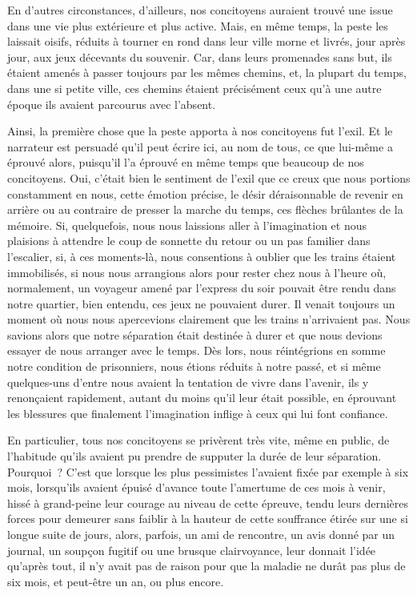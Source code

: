 \documentclass[french,twoside]{book} %
\begin{document}
En d’autres circonstances, d’ailleurs, nos concitoyens auraient trouvé une issue dans une vie plus extérieure et plus active. Mais, en même temps, la peste les laissait oisifs, réduits à tourner en rond dans leur ville morne et livrés, jour après jour, aux jeux décevants du souvenir. Car, dans leurs promenades sans but, ils étaient amenés à passer toujours par les mêmes chemins, et, la plupart du temps, dans une si petite ville, ces chemins étaient précisément ceux qu’à une autre époque ils avaient parcourus avec l’absent.\par
Ainsi, la première chose que la peste apporta à nos concitoyens fut l’exil. Et le narrateur est persuadé qu’il peut écrire ici, au nom de tous, ce que lui-même a éprouvé alors, puisqu’il l’a éprouvé en même temps que beaucoup de nos concitoyens. Oui, c’était bien le sentiment de l’exil que ce creux que nous portions constamment en nous, cette émotion précise, le désir déraisonnable de revenir en arrière ou au contraire de presser la marche du temps, ces flèches brûlantes de la mémoire. Si, quelquefois, nous nous laissions aller à l’imagination et nous plaisions à attendre le coup de sonnette du retour ou un pas familier dans l’escalier, si, à ces moments-là, nous consentions à oublier que les trains étaient immobilisés, si nous nous arrangions alors pour rester chez nous à l’heure où, normalement, un voyageur amené par l’express du soir pouvait être rendu dans notre quartier, bien entendu, ces jeux ne pouvaient durer. Il venait toujours un moment où nous nous apercevions clairement que les trains n’arrivaient pas. Nous savions alors que notre séparation était destinée à durer et que nous devions essayer de nous arranger avec le temps. Dès lors, nous réintégrions en somme notre condition de prisonniers, nous étions réduits à notre passé, et si même quelques-uns d’entre nous avaient la tentation de vivre dans l’avenir, ils y renonçaient rapidement, autant du moins qu’il leur était possible, en éprouvant les blessures que finalement l’imagination inflige à ceux qui lui font confiance.\par
En particulier, tous nos concitoyens se privèrent très vite, même en public, de l’habitude qu’ils avaient pu prendre de supputer la durée de leur séparation. Pourquoi ? C’est que lorsque les plus pessimistes l’avaient fixée par exemple à six mois, lorsqu’ils avaient épuisé d’avance toute l’amertume de ces mois à venir, hissé à grand-peine leur courage au niveau de cette épreuve, tendu leurs dernières forces pour demeurer sans faiblir à la hauteur de cette souffrance étirée sur une si longue suite de jours, alors, parfois, un ami de rencontre, un avis donné par un journal, un soupçon fugitif ou une brusque clairvoyance, leur donnait l’idée qu’après tout, il n’y avait pas de raison pour que la maladie ne durât pas plus de six mois, et peut-être un an, ou plus encore.\par
\end{document}

